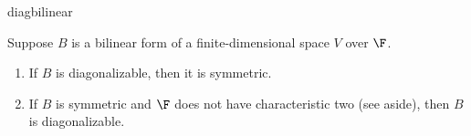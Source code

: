 \begin{example}{}{diagbilinear}
\begin{itemize}

\end{itemize}
\end{example}

\begin{thm}{}{}
Suppose $B$ is a bilinear form of a finite-dimensional space $V$ over $\F$.
\begin{enumerate}
  \item If $B$ is diagonalizable, then it is symmetric.
  \item If $B$ is symmetric and $\F$ does not have characteristic two (see aside), then $B$ is diagonalizable. 
\end{enumerate}
\end{thm}

